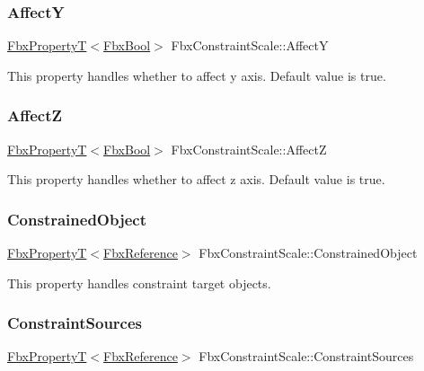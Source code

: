 \subsubsection{\texorpdfstring{AffectY}{AffectY}}
{\footnotesize\ttfamily \hyperlink{class_fbx_property_t}{Fbx\+PropertyT}$<$\hyperlink{fbxtypes_8h_a92e0562b2fe33e76a242f498b362262e}{Fbx\+Bool}$>$ Fbx\+Constraint\+Scale\+::\+AffectY}

This property handles whether to affect y axis. Default value is true. \mbox{\label{class_fbx_constraint_scale_af8cc6e516ff4b87331fc12f20af6f235}} 
\subsubsection{\texorpdfstring{AffectZ}{AffectZ}}
{\footnotesize\ttfamily \hyperlink{class_fbx_property_t}{Fbx\+PropertyT}$<$\hyperlink{fbxtypes_8h_a92e0562b2fe33e76a242f498b362262e}{Fbx\+Bool}$>$ Fbx\+Constraint\+Scale\+::\+AffectZ}

This property handles whether to affect z axis. Default value is true. \mbox{\label{class_fbx_constraint_scale_ae5eb43970ba98186d43fdb51498b21c5}} 
\subsubsection{\texorpdfstring{Constrained\+Object}{ConstrainedObject}}
{\footnotesize\ttfamily \hyperlink{class_fbx_property_t}{Fbx\+PropertyT}$<$\hyperlink{fbxtypes_8h_a44df6a2eec915cf27cd481e5c5e48a24}{Fbx\+Reference}$>$ Fbx\+Constraint\+Scale\+::\+Constrained\+Object}

This property handles constraint target objects. \mbox{\label{class_fbx_constraint_scale_a434954eedd1e80d6935881b37e9da11f}} 
\subsubsection{\texorpdfstring{Constraint\+Sources}{ConstraintSources}}
{\footnotesize\ttfamily \hyperlink{class_fbx_property_t}{Fbx\+PropertyT}$<$\hyperlink{fbxtypes_8h_a44df6a2eec915cf27cd481e5c5e48a24}{Fbx\+Reference}$>$ Fbx\+Constraint\+Scale\+::\+Constraint\+Sources}

